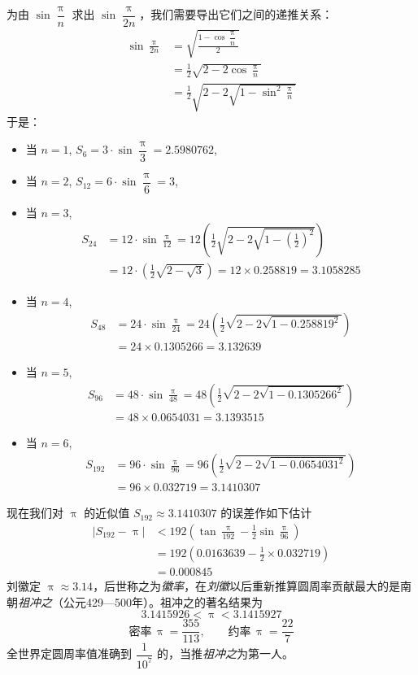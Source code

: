 为由 $\sin\dfrac{\uppi}{n}$ 求出 $\sin\dfrac{\uppi}{2n}$，我们需要导出它们之间的递推关系：
\[\begin{split}
    \sin\frac{\uppi}{2n}&=\sqrt{\frac{1-\cos\dfrac{\uppi}{n}}{2}}\\
    &=\frac{1}{2}\sqrt{2-2\cos\frac{\uppi}{n}}\\
    &=\frac{1}{2}\sqrt{2-2\sqrt{1-\sin^2\frac{\uppi}{n}}}
\end{split}\]
于是：
\begin{itemize}[itemsep=5pt]
    \item 当 $n=1$, $S_6=3\cdot \sin \dfrac{\uppi}{3}=2.5980762$, 
    \item 当 $n=2$, $S_{12}=6\cdot \sin \dfrac{\uppi}{6}=3$,
    \item 当 $n=3$, 
    \[\begin{split}
        S_{24}&=12\cdot \sin \frac{\uppi}{12}=12\left(\frac{1}{2}\sqrt{2-2\sqrt{1-\left(\frac{1}{2}\right)^2}}\right)\\
        &=12\cdot \left(\frac{1}{2}\sqrt{2-\sqrt{3}}\right)=12\times 0.258819=3.1058285
    \end{split}\]
    \item 当 $n=4$, 
    \[\begin{split}
        S_{48}&=24\cdot \sin \frac{\uppi}{24}=24\left(\frac{1}{2}\sqrt{2-2\sqrt{1-0.258819^2}}\right)\\
        &=24\times 0.1305266=3.132639
    \end{split}\]
    \item 当 $n=5$, 
    \[\begin{split}
        S_{96}&=48\cdot \sin \frac{\uppi}{48}=48\left(\frac{1}{2}\sqrt{2-2\sqrt{1-0.1305266^2}}\right)\\
        &=48\times 0.0654031=3.1393515
    \end{split}\]
    \item 当 $n=6$, 
    \[\begin{split}
        S_{192}&=96\cdot \sin \frac{\uppi}{96}=96\left(\frac{1}{2}\sqrt{2-2\sqrt{1-0.0654031^2}}\right)\\
        &=96\times 0.032719=3.1410307
    \end{split}\]
\end{itemize}

现在我们对 $\uppi$ 的近似值 $S_{192}\approx 3.1410307$ 的误差作如下估计
\[\begin{split}
    |S_{192}-\uppi|&<192\left(\tan\frac{\uppi}{192}-\frac{1}{2}\sin\frac{\uppi}{96}\right)\\
    &=192\left(0.0163639-\frac{1}{2}\times 0.032719\right)\\
    &=0.000845
\end{split}\]
刘徽定 $\uppi\approx 3.14$，后世称之为\emph{徽率}，在\emph{刘徽}以后重新推算圆周率贡献最大的是南朝\emph{祖冲之}（公元429—500年）。祖冲之的著名结果为
\[3.1415926<\uppi <3.1415927\]
\[\text{密率}\,\uppi=\frac{355}{113},\qquad \text{约率}\,\uppi=\frac{22}{7}\]
全世界定圆周率值准确到 $\dfrac{1}{10^7}$ 的，当推\emph{祖冲之}为第一人。


